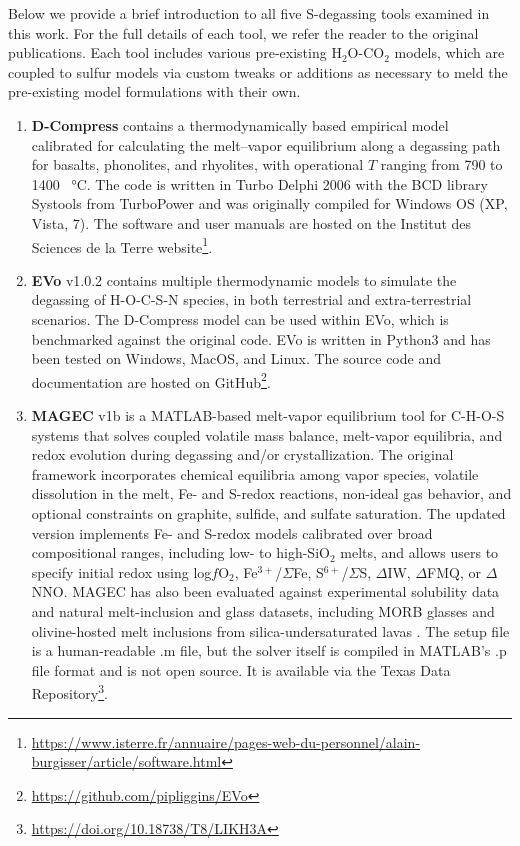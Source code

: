 \documentclass[draft, english]{volcanica-template}
\begin{document}
Below we provide a brief introduction to all five S-degassing tools examined in this work. For the full details of each tool, we refer the reader to the original publications. Each tool includes various pre-existing H$_2$O-CO$_2$ models, which are coupled to sulfur models via custom tweaks or additions as necessary to meld the pre-existing model formulations with their own. 
\begin{enumerate}
    \item \textbf{D-Compress} \parencite{Burgisser2015} contains a thermodynamically based empirical model calibrated for calculating the melt–vapor equilibrium along a degassing path for basalts, phonolites, and rhyolites, with operational $T$ ranging from 790 to 1400 \SI{}{\celsius}. The code is written in Turbo Delphi 2006 with the BCD library Systools from TurboPower and was originally compiled for Windows OS (XP, Vista, 7). The software and user manuals are hosted on the Institut des Sciences de la Terre website\footnote{\url{https://www.isterre.fr/annuaire/pages-web-du-personnel/alain-burgisser/article/software.html}}.
    \item \textbf{EVo} v1.0.2 \parencite{Liggins2020, Liggins2022} contains multiple thermodynamic models to simulate the degassing of H-O-C-S-N species, in both terrestrial and extra-terrestrial scenarios. The D-Compress model can be used within EVo, which is benchmarked against the original code. EVo is written in Python3 and has been tested on Windows, MacOS, and Linux. The source code and documentation are hosted on GitHub\footnote{\url{https://github.com/pipliggins/EVo}}.
    \item \textbf{MAGEC} v1b \parencite{Sun2022, Sun2024} is a MATLAB-based melt-vapor equilibrium tool for C-H-O-S systems that solves coupled volatile mass balance, melt-vapor equilibria, and redox evolution during degassing and/or crystallization. The original framework \parencite{Sun2022} incorporates chemical equilibria among vapor species, volatile dissolution in the melt, Fe- and S-redox reactions, non-ideal gas behavior, and optional constraints on graphite, sulfide, and sulfate saturation. The updated version \parencite{Sun2024} implements Fe- and S-redox models calibrated over broad compositional ranges, including low- to high-SiO$_2$ melts, and allows users to specify initial redox using log$f$O$_2$, Fe$^{3+}$/$\Sigma$Fe, S$^{6+}$/$\Sigma$S, $\Delta$IW, $\Delta$FMQ, or $\Delta$NNO. MAGEC has also been evaluated against experimental solubility data and natural melt-inclusion and glass datasets, including MORB glasses \parencite{Sun2022} and olivine-hosted melt inclusions from silica-undersaturated lavas \parencite{Sun2024}. The setup file is a human-readable .m file, but the solver itself is compiled in MATLAB's .p file format and is not open source. It is available via the Texas Data Repository\footnote{\url{https://doi.org/10.18738/T8/LIKH3A}}.

\end{enumerate}
\end{document}
